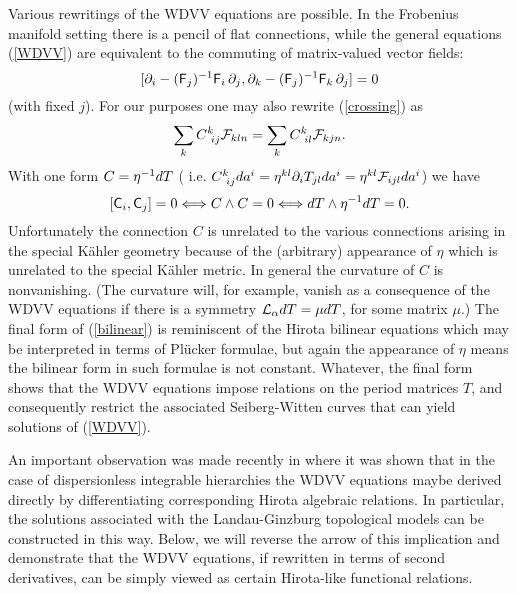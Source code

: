 \documentclass[a4paper,]{article}
\def\d{\partial}
\def\F{{\cal F}}
\def\f{{\sf F}}
\def\C{{\sf C}}
\begin{document}
Various rewritings of the WDVV equations are possible.
In the Frobenius manifold setting there is a pencil of flat connections,
while the general equations (\ref{WDVV}) are equivalent \cite{mor} to
the commuting of matrix-valued vector fields:
$$[\d_i -(\f_j)\sp{-1}\f_i\, \d_j,
   \d_k -(\f_j)\sp{-1}\f_k\, \d_j]=0$$
(with fixed $j$).
For our purposes one may also rewrite (\ref{crossing}) as
\begin{equation}
\label{crossF}
\sum_k C^k_{\ ij}\F_{kln} = \sum_k C^k_{\ il}\F_{kjn}.
\end{equation}
With one form $C=\eta\sp{-1}dT$ (
i.e. $C_{\ ij}^k da\sp{i}= \eta^{kl}\d_i T_{jl}da\sp{i}=
\eta^{kl}\F_{ijl}da\sp{i}$) we have
\begin{equation}
\label{bilinear}
[\C_i, \C_j ]=0\Longleftrightarrow C\wedge C=0
\Longleftrightarrow dT\wedge \eta\sp{-1}dT=0.
\end{equation}
Unfortunately the connection $C$ is unrelated to the various connections
arising in the special K\"ahler geometry because of the (arbitrary)
appearance of $\eta$ which is unrelated to the special K\"ahler metric.
In general the curvature of $C$ is nonvanishing.
(The curvature will, for example, vanish as a consequence of the
WDVV equations if there is a symmetry ${\cal L}_\alpha dT=\mu dT$, for
some matrix $\mu$.)
The final form of (\ref{bilinear}) is reminiscent of the Hirota
bilinear equations which may be interpreted in terms of Pl\"ucker
formulae, but again the appearance of $\eta$ means the bilinear form
in such formulae is not constant.
Whatever, the final form shows that the WDVV equations impose relations
on the period matrices $T$, and consequently restrict the associated 
Seiberg-Witten curves that can yield solutions of (\ref{WDVV}).

An important observation was made recently in \cite{BMRWZ} where it was shown
that in the case of dispersionless integrable hierarchies the WDVV
equations maybe derived directly by differentiating corresponding Hirota
algebraic relations. In particular, the solutions associated with
the Landau-Ginzburg topological models can be constructed in this way.
Below, we will reverse the arrow of this implication 
and demonstrate that the WDVV equations, if rewritten in terms of second
derivatives, can be simply viewed as certain Hirota-like
functional relations.
\end{document}
